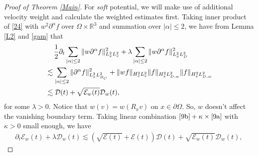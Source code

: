 \documentclass[reqno,a4paper]{amsart}
\numberwithin{equation}{section}
\newcommand{\1}{\mathbf{1}}
\newcommand{\R}{\mathbb{R}}
\renewcommand{\P}{\mathbf{P}}
\newcommand{\E}{\mathcal{E}}
\newcommand{\D}{\mathcal{D}}
\newcommand{\pa}{\partial}
\newcommand{\na}{\nabla}
\newcommand{\<}{\langle}
\renewcommand{\>}{\rangle}
\newcommand{\I}{\mathbf{I}}
\renewcommand{\P}{\mathbf{P}}
\begin{document}
\begin{proof}[Proof of Theorem \ref{Main}]
For {\em soft} potential, we will make use of additional velocity weight and calculate the weighted estimates first. 
Taking inner product of \eqref{24} with $w^2\partial^\alpha f$ over $\Omega\times\R^3$ and summation over $|\alpha|\le2$, we have from Lemma \ref{L2} and \ref{gam} that 
\begin{align}\label{9a}\notag
	&\quad\,\frac{1}{2}\partial_t\sum_{|\alpha|\le 2}\|w\pa^\alpha f\|^2_{L^2_xL^2_v} + \lambda\sum_{|\alpha|\le 2}\|w\partial^\alpha f\|_{L^2_xL^2_D}^2 \\
	&\notag\lesssim \sum_{|\alpha|\le 2}\|\pa^\alpha f\|_{L^2_xL^2_{B_C}}^2 + \|wf\|_{H^2_xL^2_v}\|f\|_{H^2_xL^2_{D,w}}\| f\|_{H^2_xL^2_{D,w}}\\
	&\lesssim \D(t) + \sqrt{\E_w(t)}\D_w(t),
\end{align}for some $\lambda>0$. 
Notice that $w(v)=w(R_xv)$ on $x\in\partial\Omega$. So, $w$ doesn't affect the vanishing boundary term. 
Taking linear combination $\eqref{9b}+\kappa\times\eqref{9a}$ %
with $\kappa>0$ small enough, we have 
\begin{align*}
	\partial_t\E_w(t) + \lambda \D_w(t) \lesssim (\sqrt{\E(t)}+\E(t))\D(t) + \sqrt{\E_w(t)}\D_w(t), 

\end{align*}
\end{proof}
\end{document}
